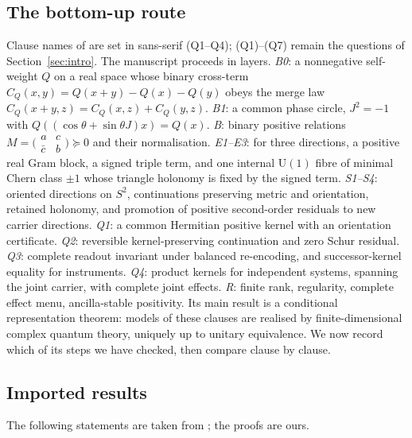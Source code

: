 \documentclass[aps,pra,onecolumn,superscriptaddress,nofootinbib,10pt]{revtex4-2}
\theoremstyle{definition}
\theoremstyle{remark}
\newcommand{\U}{\mathrm{U}}
\begin{document}
\subsection{The bottom-up route}
Clause names of \cite{CRQO} are set in sans-serif (\textsf{Q1}--\textsf{Q4}); (Q1)--(Q7) remain the questions of
Section~\ref{sec:intro}.  The manuscript \cite{CRQO} proceeds in layers.  \emph{B0}: a nonnegative self-weight $Q$ on a real
space whose binary cross-term $C_Q(x,y)=Q(x+y)-Q(x)-Q(y)$ obeys the merge law
$C_Q(x+y,z)=C_Q(x,z)+C_Q(y,z)$.  \emph{B1}: a common phase circle, $J^2=-1$ with
$Q((\cos\theta+\sin\theta J)x)=Q(x)$.  \emph{B}: binary positive relations
$M=\bigl(\begin{smallmatrix}a&c\\\bar c&b\end{smallmatrix}\bigr)\succeq0$ and their normalisation.
\emph{E1--E3}: for three directions, a positive real Gram block, a signed triple term, and one internal
$\U(1)$ fibre of minimal Chern class $\pm1$ whose triangle holonomy is fixed by the signed term.
\emph{S1--S4}: oriented directions on $S^2$, continuations preserving metric and orientation, retained
holonomy, and promotion of positive second-order residuals to new carrier directions.  \emph{\textsf{Q1}}: a
common Hermitian positive kernel with an orientation certificate.  \emph{\textsf{Q2}}: reversible
kernel-preserving continuation and zero Schur residual.  \emph{\textsf{Q3}}: complete readout invariant under
balanced re-encoding, and successor-kernel equality for instruments.  \emph{\textsf{Q4}}: product kernels for
independent systems, spanning the joint carrier, with complete joint effects.  \emph{R}: finite rank,
regularity, complete effect menu, ancilla-stable positivity.  Its main result is a conditional
representation theorem: models of these clauses are realised by finite-dimensional complex quantum
theory, uniquely up to unitary equivalence.  We now record which of its steps we have checked, then
compare clause by clause.

\subsection{Imported results}
The following statements are taken from \cite{CRQO}; the proofs are ours.
\end{document}
